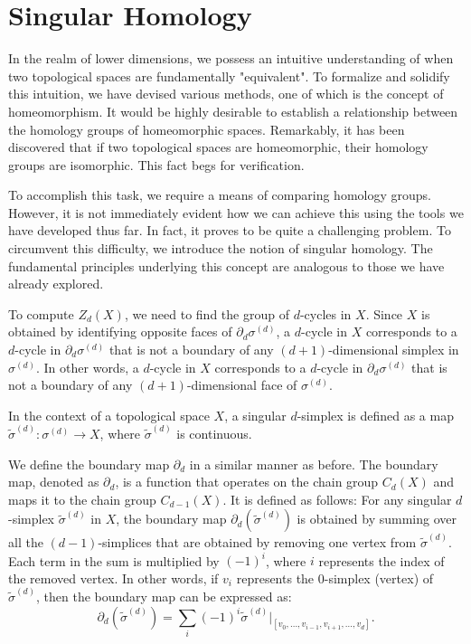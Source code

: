 \section{Singular Homology}
\label{Singular Homology} In the realm of lower dimensions, we possess an
intuitive understanding of when two topological spaces are fundamentally "equivalent".
To formalize and solidify this intuition, we have devised various methods, one of
which is the concept of homeomorphism. It would be highly desirable to establish
a relationship between the homology groups of homeomorphic spaces. Remarkably,
it has been discovered that if two topological spaces are homeomorphic, their homology
groups are isomorphic. This fact begs for verification.

To accomplish this task, we require a means of comparing homology groups.
However, it is not immediately evident how we can achieve this using the tools we
have developed thus far. In fact, it proves to be quite a challenging problem.
To circumvent this difficulty, we introduce the notion of singular homology. The
fundamental principles underlying this concept are analogous to those we have
already explored.

To compute $Z_{d}(X)$, we need to find the group of $d$-cycles in $X$. Since $X$
is obtained by identifying opposite faces of $\partial_{d} \sigma^{(d)}$, a $d$-cycle
in $X$ corresponds to a $d$-cycle in $\partial_{d} \sigma^{(d)}$ that is not a boundary
of any $(d+1)$-dimensional simplex in $\sigma^{(d)}$. In other words, a $d$-cycle
in $X$ corresponds to a $d$-cycle in $\partial_{d} \sigma^{(d)}$ that is not a boundary
of any $(d+1)$-dimensional face of $\sigma^{(d)}$.

\begin{definition}
	In the context of a topological space $X$, a singular $d$-simplex is defined as a map $\tilde{\sigma}^{(d)}: \sigma^{(d)}\to X$,
	where $\tilde{\sigma}^{(d)}$ is continuous.
\end{definition}

We define the boundary map $\partial_{d}$ in a similar manner as before. The boundary
map, denoted as $\partial_{d}$, is a function that operates on the chain group $C
_{d}(X)$ and maps it to the chain group $C_{d-1}(X)$. It is defined as follows: For
any singular $d$-simplex $\tilde{\sigma}^{(d)}$ in $X$, the boundary map
$\partial_{d}(\tilde{\sigma}^{(d)})$ is obtained by summing over all the $(d-1)$-simplices
that are obtained by removing one vertex from $\tilde{\sigma}^{(d)}$. Each term in
the sum is multiplied by $(-1)^{i}$, where $i$ represents the index of the
removed vertex. In other words, if $v_{i}$ represents the $0$-simplex (vertex)
of $\tilde{\sigma}^{(d)}$, then the boundary map can be expressed as:
\begin{equation}
	\partial_{d}(\tilde{\sigma}^{(d)}) = \sum_{i}(-1)^{i} \tilde{\sigma}^{(d)}\vert
	_{[v_0, \ldots, v_{i-1}, v_{i+1}, \ldots, v_d]}.
\end{equation}

